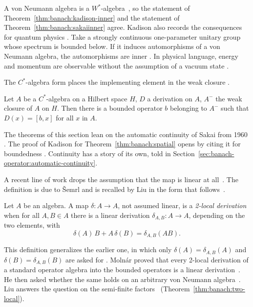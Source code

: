 A von Neumann algebra is a $W^*$-algebra~\cite[p.~2]{Sakai1991Dynamical}, so
the statement of Theorem~\ref{thm:banach:kadison-inner} and the statement of
Theorem~\ref{thm:banach:sakaiinner} agree. Kadison also records the
consequences for quantum physics
\cite[p.~291]{Kadison1966}. Take a strongly continuous one-parameter unitary
group whose spectrum is bounded below. If it induces automorphisms of a von
Neumann algebra, the automorphisms are inner \cite[p.~291]{Kadison1966}. In
physical language, energy and momentum are observable without the assumption
of a vacuum state \cite[p.~291]{Kadison1966}.

The $C^*$-algebra form places the
implementing element in the weak closure
\cite[Theorem~2, p.~274]{Sakai1966}.

\begin{theorem}\label{thm:banach:sakaiclosure}
Let $A$ be a $C^*$-algebra on a Hilbert space $H$, $D$ a derivation on $A$,
$A^-$ the weak closure of $A$ on $H$. Then there is a bounded operator $b$
belonging to $A^-$ such that $D(x)=[b,x]$ for all $x$ in $A$.
\end{theorem}

The theorems of this section lean on the automatic continuity of Sakai from
1960 \cite[p.~283]{Kadison1966}. The proof of Kadison for Theorem~\ref{thm:banach:spatial} opens by
citing it for boundedness \cite[p.~283]{Kadison1966}. Continuity has a story of its own,
told in Section~\ref{sec:banach-operator:automatic-continuity}.

A recent line of work drops the assumption that the map is linear at
all~\cite[p.~909]{Liu2025TwoLocal}. The
definition is due to Šemrl and is recalled by Liu in the form that
follows~\cite[Definition~1.2, p.~909]{Liu2025TwoLocal}.

\begin{definition}\label{def:banach:two-local}
Let $A$ be an algebra. A map $\delta\colon A \to A$, not assumed linear, is a
\emph{2-local derivation} when for all $A, B \in A$ there is a linear
derivation $\delta_{A,B}\colon A \to A$, depending on the two elements, with
\[
  \delta(A)\,B + A\,\delta(B) = \delta_{A,B}(AB).
\]
\end{definition}

This definition generalizes the earlier one, in which only
$\delta(A) = \delta_{A,B}(A)$ and $\delta(B) = \delta_{A,B}(B)$ are asked for
\cite[p.~909]{Liu2025TwoLocal}. Molnár proved that every 2-local derivation of
a standard operator algebra into the bounded operators is a linear
derivation~\cite[p.~910]{Liu2025TwoLocal}. He then asked whether the same
holds on an arbitrary von Neumann
algebra~\cite[p.~910]{Liu2025TwoLocal}. Liu answers the question on the
semi-finite factors~ (Theorem~\ref{thm:banach:two-local})\cite[Theorem~2.1, p.~910]{Liu2025TwoLocal}.

